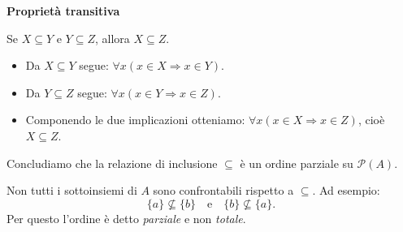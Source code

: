 \begin{esempio}
\medskip
\textbf{Proprietà transitiva}

Se \(X \subseteq Y\) e \(Y \subseteq Z\), allora \(X \subseteq Z\).

\begin{itemize}
    \item Da \(X \subseteq Y\) segue: \(\forall x (x \in X \Rightarrow x \in Y)\).
    \item Da \(Y \subseteq Z\) segue: \(\forall x (x \in Y \Rightarrow x \in Z)\).
    \item Componendo le due implicazioni otteniamo: \(\forall x (x \in X \Rightarrow x \in Z)\), cioè \(X \subseteq Z\).
\end{itemize}

\medskip
Concludiamo che la relazione di inclusione \(\subseteq\) è un ordine parziale su \(\mathcal{P}(A)\).

\end{esempio}

\begin{osservazione}
Non tutti i sottoinsiemi di \(A\) sono confrontabili rispetto a \(\subseteq\). Ad esempio:
\[
\{a\} \not\subseteq \{b\} \quad \text{e} \quad \{b\} \not\subseteq \{a\}.
\]
Per questo l’ordine è detto \emph{parziale} e non \emph{totale}.
\end{osservazione}





















